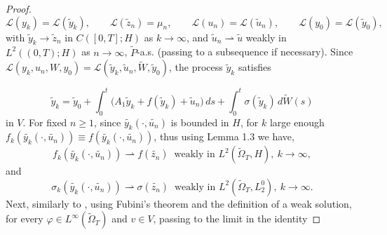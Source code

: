 \documentclass[a4paper,12pt]{article}
\numberwithin{equation}{section}
\begin{document}
\begin{proof}
\[
\mathcal L(y_k)=\mathcal L(\widetilde y_k),\qquad
\mathcal L(\widetilde z_n)=\mu_n,\qquad
\mathcal L(u_n)=\mathcal L(\widetilde u_n),\qquad
\mathcal L(y_0)=\mathcal L(\widetilde y_0),
\]
with
$\widetilde y_k\to\widetilde z_n$ in $C([0,T];H)$ as
$k\to\infty$, and
$\widetilde u_n\rightharpoonup\widetilde u$ weakly in
$L^2((0,T);H)$ as $n\to\infty$, $\widetilde P$-a.s.
(passing to a subsequence if necessary). Since
$\mathcal L(y_k,u_n,W,y_0)
=\mathcal L(\widetilde y_k,\widetilde u_n,\widetilde W,\widetilde y_0)$,
the process $\widetilde y_k$ satisfies

\begin{equation}
\widetilde y_k
=
\widetilde y_0
+
\int_0^t
\bigl(
A_1\widetilde y_k
+
f(\widetilde y_k)
+
\widetilde u_n
\bigr)\,ds
+
\int_0^t
\sigma(\widetilde y_k)\,d\widetilde W(s)
\label{3.9}
\end{equation}
in $V$. For fixed $n \geq 1$, since $\widetilde{y_k}(\cdot, \widetilde{u_n})$ is bounded in $H$, for $k$ large enough $f_k(\widetilde{y_k}(\cdot, \widetilde{u_n})) \equiv f(\widetilde{y_k}(\cdot, \widetilde{u_n}))$, thus using Lemma 1.3 \cite{28} we have,
\begin{equation}\label{3.10}
  f_k(\widetilde{y_k}(\cdot, \widetilde{u_n})) \rightharpoonup f(\widetilde{z_n}) \ \text{ weakly in } L^2(\widetilde \Omega_T, H), \ k \to \infty, 
\end{equation}
and 
\begin{equation}\label{3.11}
  \sigma_k(\widetilde{y_k}(\cdot, \widetilde{u_n})) \rightharpoonup \sigma(\widetilde{z_n}) \ \text{ weakly in } L^2(\widetilde \Omega_T, L_2^0), \ k \to \infty.    
\end{equation}
Next, similarly to \cite{20}, using Fubini's theorem and the definition
of a weak solution, for every
$\varphi\in L^\infty(\widetilde\Omega_T)$ and $v\in V$, passing to the limit in the identity  


\end{proof}
\end{document}
